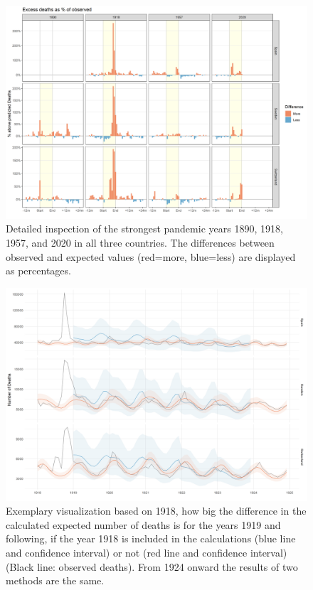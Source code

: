\documentclass{article}
\begin{document}
	
	\begin{figure}[H]
		\centering	
		\includegraphics[width=\linewidth]{../Figure_S2.png}
		\caption{Detailed inspection of the strongest pandemic years 1890, 1918, 1957, and 2020 in all three countries. The differences between observed and expected values (red=more, blue=less) are displayed as percentages.}
	\end{figure}

	
	\begin{figure}[H]
		\centering	
		\includegraphics[width=\linewidth]{../Figure_S3.png}
		\caption{Exemplary visualization based on 1918, how big the difference in the calculated expected number of deaths is for the years 1919 and following, if the year 1918 is included in the calculations (blue line and confidence interval) or not (red line and confidence interval) (Black line: observed deaths). From 1924 onward the results of two methods are the same. }
	\end{figure}
\end{document}
